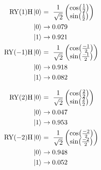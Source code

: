 \begin{equation}
    \centering
    \begin{split}
        \mathrm{RY}(1)\mathrm{H}\ket{0} &=\ \frac{1}{\sqrt{2}}\begin{pmatrix}\cos(\frac{1}{2}) \\ \sin(\frac{1}{2})\end{pmatrix}\\
        \ket{0} &\to 0.079 \\
        \ket{1} &\to 0.921 \\
        \mathrm{RY}(-1)\mathrm{H}\ket{0} &=\ \frac{1}{\sqrt{2}}\begin{pmatrix}\cos(\frac{-1}{2}) \\ \sin(\frac{-1}{2})\end{pmatrix}\\
        \ket{0} &\to 0.918 \\
        \ket{1} &\to 0.082 \\
    \end{split}
    \label{equation:normalization_range_1}
\end{equation}

\begin{equation}
    \centering
    \begin{split}
        \mathrm{RY}(2)\mathrm{H}\ket{0} &=\ \frac{1}{\sqrt{2}}\begin{pmatrix}\cos(\frac{2}{2}) \\ \sin(\frac{2}{2})\end{pmatrix}\\
        \ket{0} &\to 0.047 \\
        \ket{1} &\to 0.953 \\
        \mathrm{RY}(-2)\mathrm{H}\ket{0} &=\ \frac{1}{\sqrt{2}}\begin{pmatrix}\cos(\frac{-2}{2}) \\ \sin(\frac{-2}{2})\end{pmatrix}\\
        \ket{0} &\to 0.948 \\
        \ket{1} &\to 0.052 \\
    \end{split}
    \label{equation:normalization_range_2}
\end{equation}

